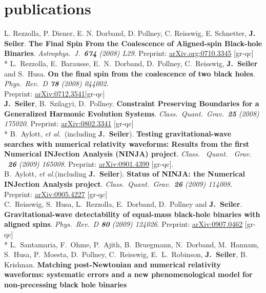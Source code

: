 \documentclass[]{seiler-resume}
\begin{document}
\section{publications}
{ {L. Rezzolla, P. Diener, E. N. Dorband, D. Pollney, C. Reisswig, E. Schnetter, {\bf J. Seiler}.}  \textbf{The Final Spin From the Coalescence of Aligned-spin Black-hole Binaries}.  \textit{Astrophys.\ J.\  {\bf 674} (2008) L29}.  
Preprint:   \href{http://arxiv.org/abs/0710.3345}{arXiv.org:0710.3345} [gr-qc]}\vspace{0.2cm} \\*
{ {L.~Rezzolla, E.~Barausse, E.~N.~Dorband, D.~Pollney, C.~Reisswig, {\bf J.~Seiler} and S.~Husa}. \textbf{On the final spin from the coalescence of two black holes}.  \textit{Phys.\ Rev.\  D {\bf 78} (2008) 044002}. \\ Preprint: \href{http://arxiv.org/abs/0712.3541}{arXiv:0712.3541}[gr-qc] \vspace{0.2cm} \\
{{\bf J.~Seiler}, B.~Szilagyi, D.~Pollney}.  \textbf{Constraint Preserving Boundaries for a Generalized Harmonic Evolution Systems}.  \textit{Class.\ Quant.\ Grav.\  {\bf 25} (2008) 175020}. Preprint: \href{http://arxiv.org/abs/0802.3341}{arXiv:0802.3341} [gr-qc]\vspace{0.2cm} \\*
{B.~Aylott, {\it et al.}~(including {\bf J.~Seiler})}. \textbf{Testing gravitational-wave searches with numerical relativity waveforms:
Results from the first Numerical INJection Analysis (NINJA) project}.
\textit{Class. \ Quant. \ Grav. \ {\bf 26} (2009) 165008}. Preprint: \href{http://arxiv.org/abs/0901.4399}{arXiv:0901.4399} [gr-qc]. \vspace{0.2cm} \\
{B.~Aylott, {\it et al.}(including {\bf J.~Seiler})}. \textbf{Status of NINJA: the Numerical INJection Analysis project}.  \textit{Class.\ Quant.\ Grav.\ {\bf 26} (2009) 114008}. Preprint: \href{http://arxiv.org/abs/0905.4227}{arXiv:0905.4227} [gr-qc] \vspace{0.2cm} \\
{C.~Reisswig, S.~Husa, L.~Rezzolla, E.~Dorband, D.~Pollney and {\bf J.~Seiler}}.
\textbf{Gravitational-wave detectability of equal-mass black-hole binaries with aligned spins}. \textit{Phys.\ Rev.\  D {\bf 80} (2009) 124026}. Preprint: \href{http://arxiv.org/abs/0907.0462}{arXiv:0907.0462} [gr-qc] \vspace{0.2cm} \\*
{L.~Santamaria, F.~Ohme, P.~Ajith, B.~Bruegmann, N.~Dorband, M.~Hannam, S.~Husa, P.~Moesta, D.~Pollney, C.~Reisswig, E.~L.~Robinson, {\bf J.~Seiler}, B. Krishnan. }\textbf{Matching post-Newtonian and numerical relativity waveforms: systematic errors and a new phenomenological model for non-precessing black hole binaries}
}
\end{document}
